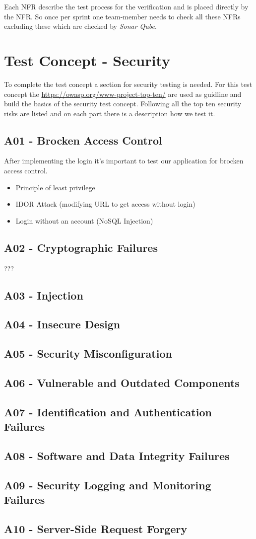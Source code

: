 Each NFR describe the test process for the verification and is placed directly by the NFR. So once per sprint one team-member needs to check all these NFRs excluding these which are checked by \textit{Sonar Qube}.

\section{Test Concept - Security}
To complete the test concept a section for security testing is needed. For this test concept the \href{OWASP Top Ten}{https://owasp.org/www-project-top-ten/} are used as guidline and build the basics of the security test concept.
Following all the top ten security risks are listed and on each part there is a description how we test it.

\subsection{A01 - Brocken Access Control}
After implementing the login it's important to test our application for brocken access control.

\begin{itemize}
  \item Principle of least privilege
  \item IDOR Attack (modifying URL to get access without login)
  \item Login without an account (NoSQL Injection)
\end{itemize}

\subsection{A02 - Cryptographic Failures}
???

\subsection{A03 - Injection}


\subsection{A04 - Insecure Design}
\subsection{A05 - Security Misconfiguration}
\subsection{A06 - Vulnerable and Outdated Components}
\subsection{A07 - Identification and Authentication Failures}
\subsection{A08 - Software and Data Integrity Failures}
\subsection{A09 - Security Logging and Monitoring Failures}
\subsection{A10 - Server-Side Request Forgery}